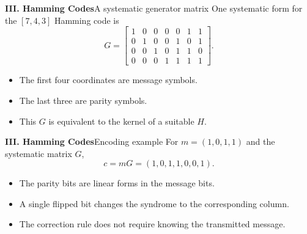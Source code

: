 \begin{frame}{\textbf{III. Hamming Codes}}{A systematic generator matrix}
\small
One systematic form for the $[7,4,3]$ Hamming code is
\[
G=
\begin{bmatrix}
1&0&0&0&0&1&1\\
0&1&0&0&1&0&1\\
0&0&1&0&1&1&0\\
0&0&0&1&1&1&1
\end{bmatrix}.
\]
\begin{itemize}
  \item The first four coordinates are message symbols.
  \item The last three are parity symbols.
  \item This $G$ is equivalent to the kernel of a suitable $H$.
\end{itemize}
\end{frame}

\begin{frame}{\textbf{III. Hamming Codes}}{Encoding example}
\small
For $m=(1,0,1,1)$ and the systematic matrix $G$,
\[
  c=mG=(1,0,1,1,0,0,1).
\]
\begin{itemize}
  \item The parity bits are linear forms in the message bits.
  \item A single flipped bit changes the syndrome to the corresponding column.
  \item The correction rule does not require knowing the transmitted message.
\end{itemize}
\end{frame}

